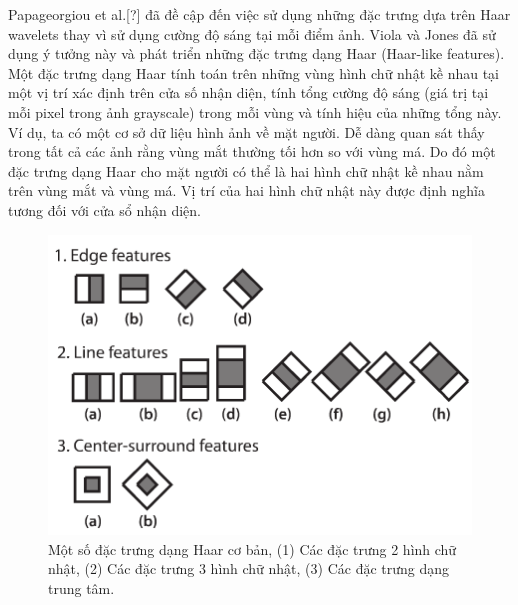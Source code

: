 \documentclass[14pt, oneside, a4paper, openany]{scrartcl}
\begin{document}
Papageorgiou et al.[?] đã đề cập đến việc sử dụng những đặc trưng dựa trên Haar wavelets thay vì sử dụng cường độ sáng tại mỗi điểm ảnh. Viola và Jones đã sử dụng ý tưởng này và phát triển những đặc trưng dạng Haar (Haar-like features).
Một đặc trưng dạng Haar tính toán trên những vùng hình chữ nhật kề nhau tại một vị trí xác định trên cửa số nhận diện, tính tổng cường độ sáng (giá trị tại mỗi pixel trong ảnh grayscale) trong mỗi vùng và tính hiệu của những tổng này.
Ví dụ, ta có một cơ sở dữ liệu hình ảnh về mặt người. Dễ dàng quan sát thấy trong tất cả các ảnh rằng vùng mắt thường tối hơn so với vùng má. Do đó một đặc trưng dạng Haar cho mặt người có thể là hai hình chữ nhật kề nhau nằm trên vùng mắt và vùng má. Vị trí của hai hình chữ nhật này được định nghĩa tương đối với cửa sổ nhận diện.

\begin{figure}
	\centering
	\includegraphics[scale=0.8]{figures/HaarFeatures.png} 
	\caption[Một số đặc trưng dạng Haar cơ bản]{Một số đặc trưng dạng Haar cơ bản, (1) Các đặc trưng 2 hình chữ nhật, 
		(2) Các đặc trưng 3 hình chữ nhật,
		(3) Các đặc trưng dạng trung tâm.}
\end{figure}
\end{document}
